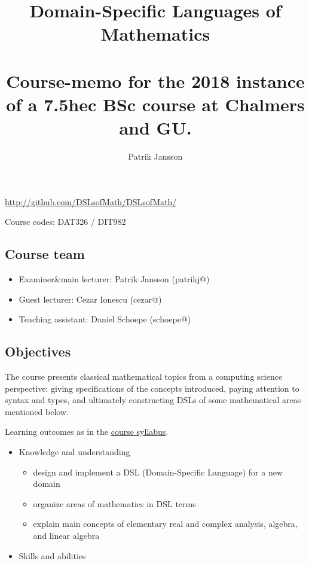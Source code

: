 \documentclass[10pt,a4paper]{article}
\title{Domain-Specific Languages of Mathematics \\\\ \small Course-memo for
the 2018 instance of a 7.5hec BSc course at Chalmers and GU.}
\author{Patrik Jansson}
\begin{document}
\maketitle
\begin{multicols}{2}


\providecommand{\tightlist}{%
  \setlength{\itemsep}{0pt}\setlength{\parskip}{0pt}}

  \url{http://github.com/DSLsofMath/DSLsofMath/}

  Course codes: DAT326 / DIT982

  \subsection{Course team}\label{course-team}

  \begin{itemize}
  \tightlist
  \item
    Examiner\&main lecturer: Patrik Jansson (patrikj@)
  \item
    Guest lecturer: Cezar Ionescu (cezar@)
  \item
    Teaching assistant: Daniel Schoepe (schoepe@)
  \end{itemize}

  \subsection{Objectives}\label{objectives}

  The course presents classical mathematical topics from a computing
  science perspective: giving specifications of the concepts introduced,
  paying attention to syntax and types, and ultimately constructing DSLs
  of some mathematical areas mentioned below.

  Learning outcomes as in the
  \href{https://www.student.chalmers.se/sp/course?course_id=26170}{course
  syllabus}.

  \begin{itemize}
  \tightlist
  \item
    Knowledge and understanding

    \begin{itemize}
    \tightlist
    \item
      design and implement a DSL (Domain-Specific Language) for a new
      domain
    \item
      organize areas of mathematics in DSL terms
    \item
      explain main concepts of elementary real and complex analysis,
      algebra, and linear algebra
    \end{itemize}
  \item
    Skills and abilities


\end{itemize}
\end{multicols}
\end{document}
